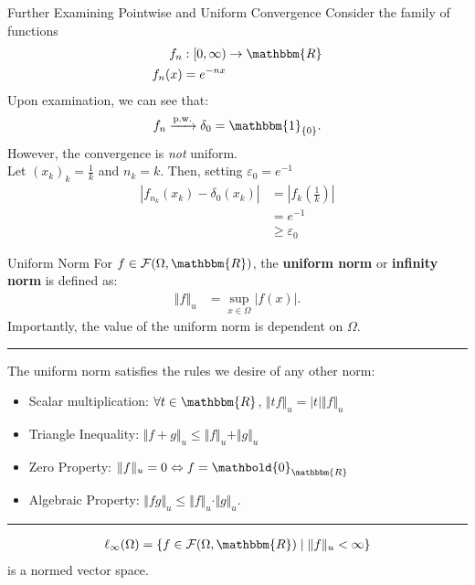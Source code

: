 \documentclass[10pt]{extarticle}
\renewcommand{\mathbf}[1]{\mathbold{#1}}
\newcommand{\R}{\mathbbm{R}}
\begin{document}
  \begin{problem}{Further Examining Pointwise and Uniform Convergence}
    Consider the family of functions
    \begin{align*}
      f_n&: [0,\infty) \rightarrow \R\\
      f_n(x) &= e^{-nx}
    \end{align*}
    Upon examination, we can see that:
    \begin{align*}
      f_n \xrightarrow{\text{p.w.}} \delta_0 = \mathbbm{1}_{\{0\}}.
    \end{align*}
    However, the convergence is \textit{not} uniform.\\

    Let $(x_k)_k = \frac{1}{k}$ and $n_k = k$. Then, setting $\varepsilon_0 = e^{-1}$
    \begin{align*}
      \left|f_{n_k}(x_k) - \delta_0(x_k)\right| &= \left|f_k\left(\frac{1}{k}\right)\right|\\
                                                &= e^{-1}\\
                                                &\geq \varepsilon_0
    \end{align*}
  \end{problem}
  \begin{problem}{Uniform Norm}
    For $f\in \mathcal{F}(\Omega,\R)$, the \textbf{uniform norm} or \textbf{infinity norm} is defined as:
    \begin{align*}
      \left\Vert f \right\Vert_{u} &= \sup_{x\in\Omega}\left|f(x)\right|.
    \end{align*}
    Importantly, the value of the uniform norm is dependent on $\Omega$.\\
    \vspace{4pt}
    \rule{\textwidth}{0.4pt}
    \vspace{4pt}
    The uniform norm satisfies the rules we desire of any other norm:
    \begin{itemize}
      \item Scalar multiplication: $\forall t\in\R$, $\Vert tf\Vert_u = |t|\Vert f \Vert_u$
      \item Triangle Inequality: $\Vert f + g \Vert_u \leq \Vert f \Vert_u + \Vert g \Vert_u$
      \item Zero Property: $\Vert f\Vert_u = 0 \Leftrightarrow f = \mathbf{0}_{\R}$
      \item Algebraic Property: $\Vert fg\Vert_u \leq \Vert f\Vert_u \cdot \Vert g \Vert_u$.
    \end{itemize}
    \vspace{4pt}
    \rule{\textwidth}{0.4pt}
    \vspace{4pt}
    \begin{align*}
      \ell_{\infty}(\Omega) = \left\{f\in\mathcal{F}(\Omega,\R)\mid \Vert f \Vert_u < \infty\right\}
    \end{align*}
    is a normed vector space.
  \end{problem}
\end{document}
